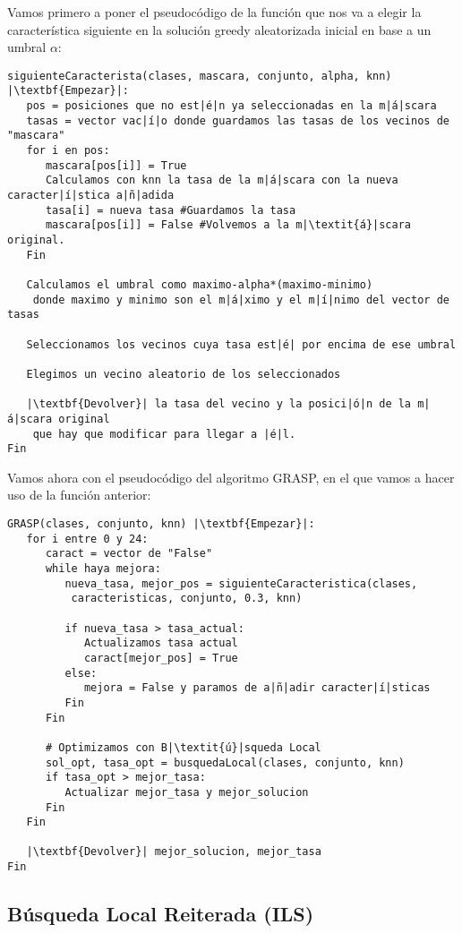 \documentclass[12pt]{article}
\begin{document}
Vamos primero a poner el pseudocódigo de la función que nos va a elegir la característica siguiente en la solución greedy aleatorizada inicial en base a un umbral $\alpha$:
\begin{lstlisting}
siguienteCaracterista(clases, mascara, conjunto, alpha, knn) |\textbf{Empezar}|:
   pos = posiciones que no est|é|n ya seleccionadas en la m|á|scara
   tasas = vector vac|í|o donde guardamos las tasas de los vecinos de "mascara"
   for i en pos:
      mascara[pos[i]] = True
      Calculamos con knn la tasa de la m|á|scara con la nueva caracter|í|stica a|ñ|adida
      tasa[i] = nueva tasa #Guardamos la tasa
      mascara[pos[i]] = False #Volvemos a la m|\textit{á}|scara original.
   Fin
   
   Calculamos el umbral como maximo-alpha*(maximo-minimo)
    donde maximo y minimo son el m|á|ximo y el m|í|nimo del vector de tasas
   
   Seleccionamos los vecinos cuya tasa est|é| por encima de ese umbral
   
   Elegimos un vecino aleatorio de los seleccionados
   
   |\textbf{Devolver}| la tasa del vecino y la posici|ó|n de la m|á|scara original
    que hay que modificar para llegar a |é|l.
Fin
\end{lstlisting}

Vamos ahora con el pseudocódigo del algoritmo GRASP, en el que vamos a hacer uso de la función anterior:
\begin{lstlisting}
GRASP(clases, conjunto, knn) |\textbf{Empezar}|:
   for i entre 0 y 24:
      caract = vector de "False"
      while haya mejora:
         nueva_tasa, mejor_pos = siguienteCaracteristica(clases,
          caracteristicas, conjunto, 0.3, knn)
      
         if nueva_tasa > tasa_actual:
            Actualizamos tasa actual
            caract[mejor_pos] = True
         else:
            mejora = False y paramos de a|ñ|adir caracter|í|sticas
         Fin
      Fin
   
      # Optimizamos con B|\textit{ú}|squeda Local
      sol_opt, tasa_opt = busquedaLocal(clases, conjunto, knn)
      if tasa_opt > mejor_tasa:
         Actualizar mejor_tasa y mejor_solucion
      Fin
   Fin
   
   |\textbf{Devolver}| mejor_solucion, mejor_tasa
Fin

\end{lstlisting}

\subsection{Búsqueda Local Reiterada (ILS)}
\end{document}
